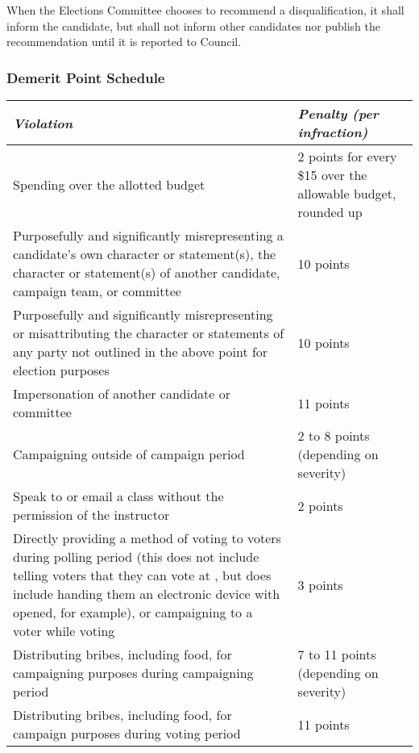 When the Elections Committee chooses to recommend a disqualification, it shall inform the candidate, but shall not inform other candidates nor publish the recommendation until it is reported to Council.


    \subsubsection{Demerit Point Schedule}
\label{elections:demeritPointSchedule} 


\begin{center}
	\begin{tabular}{| p{11.5cm} | p{4cm} |}
		\hline
		\rowcolor{lightgray} \textit{\textbf{Violation}} & \textit{\textbf{Penalty (per infraction)}}  \\ 
		\hline
		Spending over the allotted budget & 2 points for every \$15 over the allowable budget, rounded up\\  
		\hline
		Purposefully and significantly misrepresenting a candidate’s own character or statement(s), the character or statement(s) of another candidate, campaign team, or committee & 10 points \\
		\hline
		Purposefully and significantly misrepresenting or misattributing the character or statements of any party not outlined in the above point for election purposes & 10 points \\
		\hline 
		Impersonation of another candidate or committee & 11 points \\
		\hline
		Campaigning outside of campaign period & 2 to 8 points (depending on severity) \\
		\hline
		Speak to or email a class without the permission of the instructor & 2 points \\
		\hline
		Directly providing a method of voting to voters during polling period (this does not include telling voters that they can vote at \votewebsite, but does include handing them an electronic device with \votewebsite{} opened, for example), or campaigning to a voter while voting & 3 points \\
		\hline
		Distributing bribes, including food, for campaigning purposes during campaigning period & 7 to 11 points (depending on severity) \\
		\hline
		Distributing bribes, including food, for campaign purposes during voting period & 11 points \\
		\hline

\end{tabular}
\end{center}
